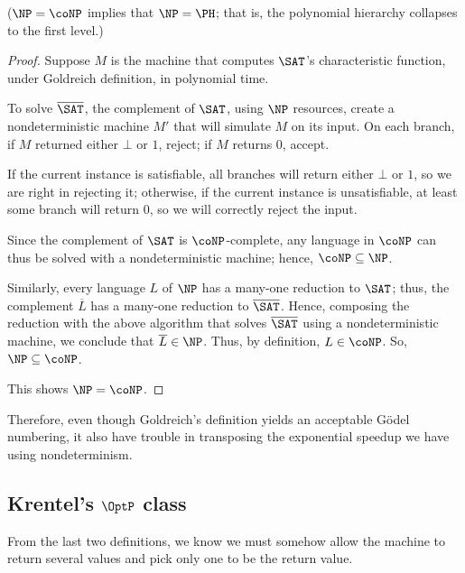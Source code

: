 \documentclass[12pt]{article}
\theoremstyle{definition}
\begin{document}
($\NP = \coNP$ implies that $\NP = \PH$; that is,
the polynomial hierarchy collapses to the first level.)

\begin{proof}
    Suppose $M$ is the machine that computes $\SAT$'s characteristic function,
    under Goldreich definition, in polynomial time.

    To solve $\overline \SAT$,
    the complement of $\SAT$,
    using $\NP$ resources,
    create a nondeterministic machine $M'$ that will simulate $M$ on its input.
    On each branch, if $M$ returned either $\bot$ or $1$, reject;
    if $M$ returns $0$, accept.

    If the current instance is satisfiable,
    all branches will return either $\bot$ or $1$,
    so we are right in rejecting it;
    otherwise, if the current instance is unsatisfiable,
    at least some branch will return $0$,
    so we will correctly reject the input.

    Since the complement of $\SAT$ is $\coNP$-complete,
    any language in $\coNP$ can thus be solved with a nondeterministic machine;
    hence, $\coNP \subseteq \NP$.

    Similarly,
    every language $L$ of $\NP$ has a many-one reduction to $\SAT$;
    thus, the complement $\overline L$ has a many-one reduction
    to $\overline \SAT$.
    Hence, composing the reduction with the above algorithm
    that solves $\overline \SAT$ using a nondeterministic machine,
    we conclude that $\overline L \in \NP$.
    Thus, by definition, $L \in \coNP$.
    So, $\NP \subseteq \coNP$.

    This shows $\NP = \coNP$.
\end{proof}

Therefore, even though Goldreich's definition
yields an acceptable Gödel numbering,
it also have trouble in transposing the exponential speedup
we have using nondeterminism.

\subsection{Krentel's $\OptP$ class}

From the last two definitions,
we know we must somehow allow the machine to return several values
and pick only one to be the return value.
\end{document}
